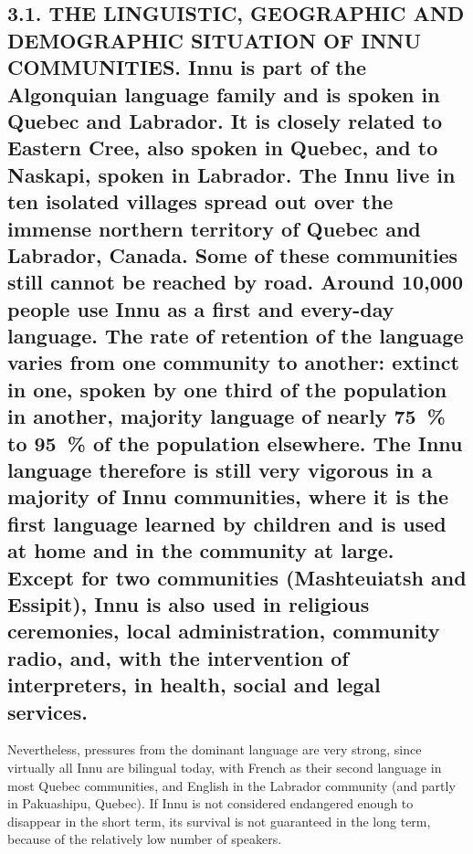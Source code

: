 \documentclass[letterpaper]{article}
\begin{document}
\subsection[3.1. THE LINGUISTIC, GEOGRAPHIC AND DEMOGRAPHIC SITUATION OF INNU COMMUNITIES. Innu is part of the Algonquian language family and is spoken in Quebec and Labrador. It is closely related to Eastern Cree, also spoken in Quebec, and to Naskapi, spoken in Labrador. The Innu live in ten isolated villages spread out over the immense northern territory of Quebec and Labrador, Canada. Some of these communities still cannot be reached by road. Around 10,000 people use Innu as a first and every{}-day language. The rate of retention of the language varies from one community to another: extinct in one, spoken by one third of the population in another, majority language of nearly 75~\% to 95~\% \ of the population elsewhere. The Innu language therefore is still very vigorous in a majority of Innu communities, where it is the first language learned by children and is used at home and in the community at large. Except for two communities (Mashteuiatsh and Essipit), Innu is also used in religious ceremonies, local administration, community radio, and, with the intervention of interpreters, in health, social and legal services.]{3.1. THE LINGUISTIC, GEOGRAPHIC AND DEMOGRAPHIC SITUATION OF INNU COMMUNITIES. \textmd{Innu}\textmd{ }\textmd{is part of the}\textmd{ Algonquian }\textmd{language }\textmd{family and is spoken in Quebec and Labrador. It is closely related to }\textmd{Eastern Cree}\textmd{, also spoken in Quebec,}\textmd{ and t}\textmd{o}\textmd{ Naskapi}\textmd{, spoken in Labrador}\textmd{. The Innu live in ten isolated villages spread out over the immense }\textmd{northern }\textmd{territory of Quebec and Labrador}\textmd{, Canada}\textmd{. Some of these communities still cannot be reached by road. Around 10,000 people use Innu as a }\textmd{first }\textmd{and every-day language. The rate of retention of the language varies from one community to }\textmd{another}\textmd{: extinct in one, spoken by one third of the population in another, majority language of nearly 75~\% to 95~\% }\textmd{ of the population }\textmd{elsewhere. The Innu language therefore is still very vigorous in }\textmd{a }\textmd{majority of }\textmd{Innu }\textmd{communities}\textmd{, where it is the first language learned by children}\textmd{ and }\textmd{is used }\textmd{at home }\textmd{and }\textmd{in }\textmd{the communit}\textmd{y}\textmd{ at large}\textmd{. }\textmd{Except for two communities (Mashteuiatsh and Essipit), Innu is }\textmd{also used in}\textmd{ religious ceremonies}\textmd{, }\textmd{local administration, community radio, and}\textmd{, with the intervention of interpret}\textmd{er}\textmd{s,}\textmd{ in health}\textmd{,}\textmd{ socia}\textmd{l and }\textmd{legal services}\textmd{.}}
Nevertheless, pressures from the dominant language are very strong, since virtually all Innu are bilingual today, with French as their second language in most Quebec communities, and English in the Labrador community (and partly in Pakuashipu, Quebec). If Innu is not considered endangered enough to disappear in the short term, its survival is not guaranteed in the long term, because of the relatively low number of speakers. 
\end{document}

